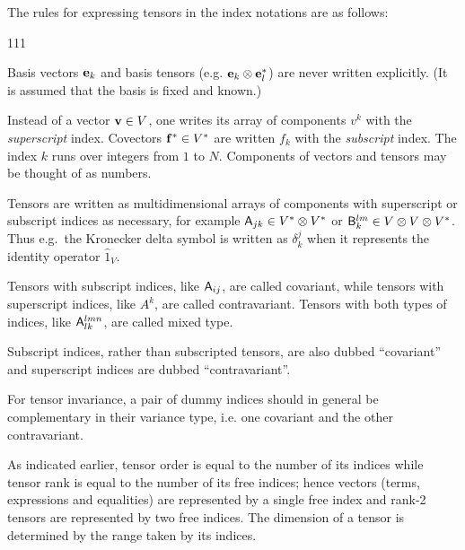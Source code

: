The rules for expressing tensors in the index notations are as follows:
\begin{dinglist}{111}
 \item Basis vectors $\mathbf{ e}_{k}$ and basis tensors (e.g. $\mathbf{ e}_{k}\otimes\mathbf{ e}_{l}^{*}$)
are never written explicitly. (It is assumed that the basis is fixed
and known.)
\item Instead of a vector $\mathbf{ v}\in V$, one writes its array of components
$v^{k}$ with the \emph{superscript} index.
Covectors $\mathbf{ f}^{*}\in V^{*}$
are written $f_{k}$ with the \emph{subscript} index. The index $k$
runs over integers from $1$ to $N$. Components of vectors and tensors
may be thought of as numbers.
\item Tensors are written as multidimen\-sion\-al arrays of components
with superscript or subscript indices as necessary, for example $\mathsf{A}_{jk}\in V^{*}\otimes V^{*}$
or $\mathsf{B}_{k}^{lm}\in V\otimes V\otimes V^{*}$. Thus e.g.~the Kronecker
delta symbol is written as $\delta_{k}^{j}$ when it represents the
identity operator $\hat{1}_{V}$. 


\item Tensors with subscript indices, like $\mathsf{A}_{ij}$, are called
covariant, while tensors with superscript indices, like $A^{k}$,
are called contravariant. Tensors with both types of indices, like
$\mathsf{A}_{lk}^{lmn}$, are called mixed type.

\item Subscript indices, rather than subscripted tensors, are
also dubbed ``covariant'' and superscript indices are dubbed ``contravariant''.

\item For tensor invariance, a pair of dummy indices should in
general be complementary in their variance type, i.e. one covariant
and the other contravariant. 

\item As indicated earlier, tensor order is equal to the number
of its indices while tensor rank is equal to the number of its free
indices; hence vectors (terms, expressions and equalities) are represented
by a single free index and rank-2 tensors are represented by two free
indices. The dimension of a tensor is determined by the range taken
by its indices.


\end{dinglist}
